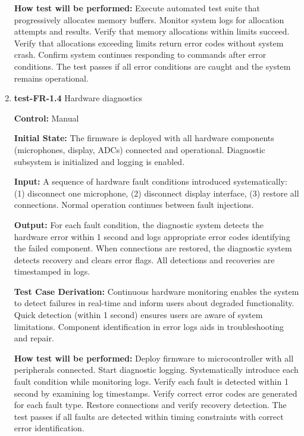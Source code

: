 \documentclass[12pt, titlepage]{article}
\begin{document}
\begin{enumerate}
\textbf{How test will be performed:}
Execute automated test suite that progressively allocates memory buffers. Monitor 
system logs for allocation attempts and results. Verify that memory allocations 
within limits succeed. Verify that allocations exceeding limits return error 
codes without system crash. Confirm system continues responding to commands 
after error conditions. The test passes if all error conditions are caught and 
the system remains operational.

\item{\textbf{test-FR-1.4} Hardware diagnostics\\}

\textbf{Control:} Manual
					
\textbf{Initial State:} 
The firmware is deployed with all hardware components (microphones, display, 
ADCs) connected and operational. Diagnostic subsystem is initialized and logging 
is enabled.
					
\textbf{Input:}
A sequence of hardware fault conditions introduced systematically: (1) disconnect 
one microphone, (2) disconnect display interface, (3) restore all connections. 
Normal operation continues between fault injections.
					
\textbf{Output:}
For each fault condition, the diagnostic system detects the hardware error 
within 1 second and logs appropriate error codes identifying the failed 
component. When connections are restored, the diagnostic system detects recovery 
and clears error flags. All detections and recoveries are timestamped in logs.

\textbf{Test Case Derivation:} 
Continuous hardware monitoring enables the system to detect failures in real-time 
and inform users about degraded functionality. Quick detection (within 1 second) 
ensures users are aware of system limitations. Component identification in error 
logs aids in troubleshooting and repair.
					
\textbf{How test will be performed:}
Deploy firmware to microcontroller with all peripherals connected. Start diagnostic 
logging. Systematically introduce each fault condition while monitoring logs. 
Verify each fault is detected within 1 second by examining log timestamps. 
Verify correct error codes are generated for each fault type. Restore connections 
and verify recovery detection. The test passes if all faults are detected within 
timing constraints with correct error identification.

\end{enumerate}
\end{document}
